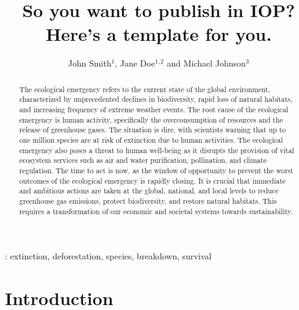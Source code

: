 \documentclass[
  12pt]{iopart}
\begin{document}
\title[IOP Template Format]{So you want to publish in IOP? Here's a
template for you.}

\author{John Smith$^1$, Jane
Doe$^1$$^,$$^2$ and Michael
Johnson$^3$}

    \address{$^1$ Department of Biodiversity Conservation, Ecological
Research Institute, 123 Willow Road, Anytown, UK NW 123}
    \address{$^2$ Department of Ecosystem Management, University of
Environmental Science, 456 Birch Lane, Anycity, UK NR 543}
    \address{$^3$ Department of Renewable Energy and Carbon
Sequestration, Institute of Climate Change and Sustainability, 789 Oak
Street, Anybury, UK BT 987}


\begin{abstract}
The ecological emergency refers to the current state of the global
environment, characterized by unprecedented declines in biodiversity,
rapid loss of natural habitats, and increasing frequency of extreme
weather events. The root cause of the ecological emergency is human
activity, specifically the overconsumption of resources and the release
of greenhouse gases. The situation is dire, with scientists warning that
up to one million species are at risk of extinction due to human
activities. The ecological emergency also poses a threat to human
well-being as it disrupts the provision of vital ecosystem services such
as air and water purification, pollination, and climate regulation. The
time to act is now, as the window of opportunity to prevent the worst
outcomes of the ecological emergency is rapidly closing. It is crucial
that immediate and ambitious actions are taken at the global, national,
and local levels to reduce greenhouse gas emissions, protect
biodiversity, and restore natural habitats. This requires a
transformation of our economic and societal systems towards
sustainability.
\end{abstract}

: extinction, deforestation, species, breakdown, survival

\submitto{\ERL}

\maketitle


\section{Introduction}\label{introduction}
\end{document}
